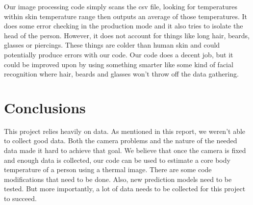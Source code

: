 	Our image processing code simply scans the csv file, looking for temperatures within skin temperature range then outputs an average of those temperatures. It does some error checking in the production mode and it also tries to isolate the head of the person. However, it does not account for things like long hair, beards, glasses or piercings. These things are colder than human skin and could potentially produce errors with our code. Our code does a decent job, but it could be improved upon by using something smarter like some kind of facial recognition where hair, beards and glasses won’t throw off the data gathering.
	

\section*{Conclusions}
This project relies heavily on data. As mentioned in this report, we weren't able to collect good data. Both the camera problems and the nature of the needed data made it hard to achieve that goal. We believe that once the camera is fixed and enough data is collected, our code can be used to estimate a core body temperature of a person using a thermal image. There are some code modifications that need to be done. Also, new prediction models need to be tested. But more importantly, a lot of data needs to be collected for this project to succeed. 


